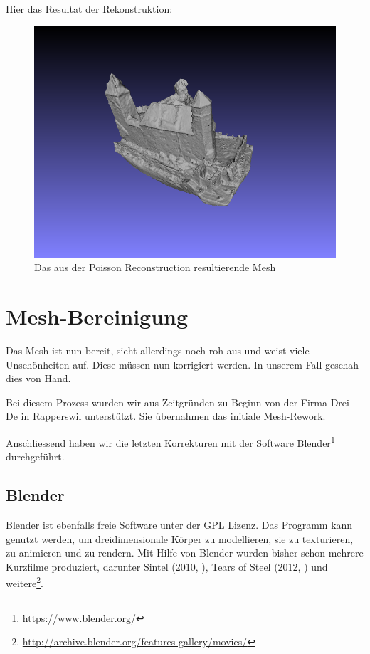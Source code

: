 Hier das Resultat der Rekonstruktion:

\begin{figure}[H]
	\centering
	\includegraphics[width=\textwidth]{images/poisson-mesh.png}
	\caption{Das aus der Poisson Reconstruction resultierende Mesh}
	\label{img:meshlab_poisson_result}
\end{figure}


\section{Mesh-Bereinigung}

\label{workflow:mesh-cleanup}

Das Mesh ist nun bereit, sieht allerdings noch roh aus und weist viele
Unschönheiten auf. Diese müssen nun korrigiert werden. In unserem Fall geschah
dies von Hand.

Bei diesem Prozess wurden wir aus Zeitgründen zu Beginn von der Firma Drei-De in
Rapperswil unterstützt. Sie übernahmen das initiale Mesh-Rework.

Anschliessend haben wir die letzten Korrekturen mit der Software
Blender\footnote{\url{https://www.blender.org/}} durchgeführt.

\subsection{Blender}

Blender ist ebenfalls freie Software unter der GPL Lizenz. Das Programm kann
genutzt werden, um dreidimensionale Körper zu modellieren, sie zu texturieren,
zu animieren und zu rendern. Mit Hilfe von Blender wurden bisher schon mehrere
Kurzfilme produziert, darunter Sintel (2010, \cite{sintel}), Tears of Steel
(2012, \cite{tearsofsteel}) und
weitere\footnote{\url{http://archive.blender.org/features-gallery/movies/}}.

